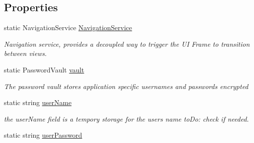 \subsection*{Properties}
\begin{DoxyCompactItemize}
\item 
static Navigation\+Service \hyperlink{class_listen_to_me_1_1_app_ae35ddc10bf8aad1a80c92c71c6e3b7fc}{Navigation\+Service}
\begin{DoxyCompactList}\small\item\em Navigation service, provides a decoupled way to trigger the UI Frame to transition between views. \end{DoxyCompactList}\item 
static Password\+Vault \hyperlink{class_listen_to_me_1_1_app_ab90eb28339ec63046179e8756fd08314}{vault}
\begin{DoxyCompactList}\small\item\em The password vault stores application specific usernames and passwords encrypted \end{DoxyCompactList}\item 
static string \hyperlink{class_listen_to_me_1_1_app_a8cb2cb11cbb86861f2e1a11840270bf0}{user\+Name}
\begin{DoxyCompactList}\small\item\em the user\+Name field is a tempory storage for the user\textquotesingle{}s name to\+Do\+: check if needed. \end{DoxyCompactList}\item 
static string \hyperlink{class_listen_to_me_1_1_app_a64ce0f541633af939a3afca3a1d15dec}{user\+Password}
\end{DoxyCompactItemize}
